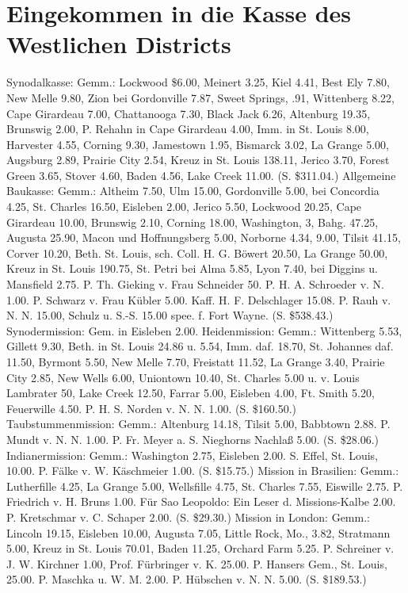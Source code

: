 \chapter[Kasse des Westlichen Districts]{Eingekommen in die Kasse des Westlichen Districts}

Synodalkasse: Gemm.: Lockwood \$6.00, Meinert 3.25, Kiel 4.41, Best Ely 7.80, New Melle 9.80, Zion bei Gordonville 7.87, Sweet Springs, .91, Wittenberg 8.22, Cape Girardeau 7.00, Chattanooga 7.30, Black Jack 6.26, Altenburg 19.35, Brunswig 2.00, P. Rehahn in Cape Girardeau 4.00, Imm. in St. Louis 8.00, Harvester 4.55, Corning 9.30, Jamestown 1.95, Bismarck 3.02, La Grange 5.00, Augsburg 2.89, Prairie City 2.54, Kreuz in St. Louis 138.11, Jerico 3.70, Forest Green 3.65, Stover 4.60, Baden 4.56, Lake Creek 11.00. (S. \$311.04.)
Allgemeine Baukasse: Gemm.: Altheim 7.50, Ulm 15.00, Gordonville 5.00, bei Concordia 4.25, St. Charles 16.50, Eisleben 2.00, Jerico 5.50, Lockwood 20.25, Cape Girardeau 10.00, Brunswig 2.10, Corning 18.00, Washington, 3, Bahg. 47.25, Augusta 25.90, Macon und Hoffnungsberg 5.00, Norborne 4.34, 9.00, Tilsit 41.15, Corver 10.20, Beth. St. Louis, sch. Coll. H. G. Böwert 20.50, La Grange 50.00, Kreuz in St. Louis 190.75, St. Petri bei Alma 5.85, Lyon 7.40, bei Diggins u. Mansfield 2.75. P. Th. Gieking v. Frau Schneider 50. P. H. A. Schroeder v. N. 1.00. P. Schwarz v. Frau Kübler 5.00. Kaff. H. F. Delschlager 15.08. P. Rauh v. N. N. 15.00, Schulz u. S.-S. 15.00 spee. f. Fort Wayne. (S. \$538.43.)
Synodermission: Gem. in Eisleben 2.00.
Heidenmission: Gemm.: Wittenberg 5.53, Gillett 9.30, Beth. in St. Louis 24.86 u. 5.54, Imm. daf. 18.70, St. Johannes daf. 11.50, Byrmont 5.50, New Melle 7.70, Freistatt 11.52, La Grange 3.40, Prairie City 2.85, New Wells 6.00, Uniontown 10.40, St. Charles 5.00 u. v. Louis Lambrater 50, Lake Creek 12.50, Farrar 5.00, Eisleben 4.00, Ft. Smith 5.20, Feuerwille 4.50. P. H. S. Norden v. N. N. 1.00. (S. \$160.50.)
Taubstummenmission: Gemm.: Altenburg 14.18, Tilsit 5.00, Babbtown 2.88. P. Mundt v. N. N. 1.00. P. Fr. Meyer a. S. Nieghorns Nachlaß 5.00. (S. \$28.06.)
Indianermission: Gemm.: Washington 2.75, Eisleben 2.00. S. Effel, St. Louis, 10.00. P. Fälke v. W. Käschmeier 1.00. (S. \$15.75.)
Mission in Brasilien: Gemm.: Lutherfille 4.25, La Grange 5.00, Wellsfille 4.75, St. Charles 7.55, Eiswille 2.75. P. Friedrich v. H. Bruns 1.00. Für Sao Leopoldo: Ein Leser d. Missions-Kalbe 2.00. P. Kretschmar v. C. Schaper 2.00. (S. \$29.30.)
Mission in London: Gemm.: Lincoln 19.15, Eisleben 10.00, Augusta 7.05, Little Rock, Mo., 3.82, Stratmann 5.00, Kreuz in St. Louis 70.01, Baden 11.25, Orchard Farm 5.25. P. Schreiner v. J. W. Kirchner 1.00, Prof. Fürbringer v. K. 25.00. P. Hansers Gem., St. Louis, 25.00. P. Maschka u. W. M. 2.00. P. Hübschen v. N. N. 5.00. (S. \$189.53.)
